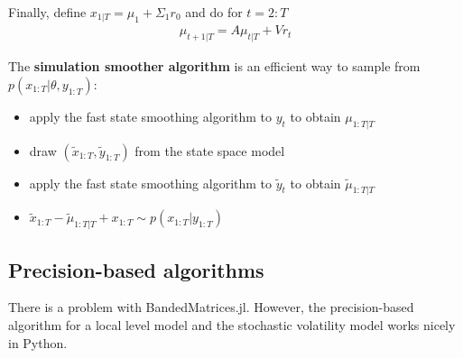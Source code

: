 \documentclass[12pt,a4paper]{scrartcl}
\begin{document}
Finally, define $x_{1|T}=\mu_1 + \Sigma_1 r_0$ and do for $t=2:T$
\begin{align*}
\mu_{t+1|T} = A \mu_{t|T} + V r_t
\end{align*}

The \textbf{simulation smoother algorithm} \citep{bibid} is an efficient way to sample from $p(x_{1:T}|\theta, y_{1:T})$:
\begin{itemize}
	\item apply the fast state smoothing algorithm to $y_t$ to obtain $\mu_{1:T|T}$
	\item draw $(\tilde{x}_{1:T}, \tilde{y}_{1:T})$ from the state space model
	\item apply the fast state smoothing algorithm to $\tilde{y}_t$ to obtain $\tilde{\mu}_{1:T|T}$
	\item $\tilde{x}_{1:T} - \tilde{\mu}_{1:T|T} + x_{1:T} \sim p(x_{1:T}|y_{1:T})$
\end{itemize}

\subsection{Precision-based algorithms}

There is a problem with \textsf{BandedMatrices.jl}. However, the precision-based algorithm for a local level model and the stochastic volatility model works nicely in Python.

%
%
\end{document}

